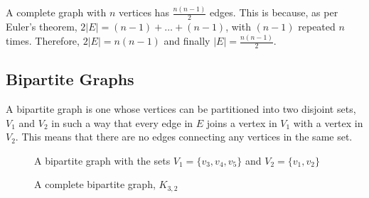 


A complete graph with $n$ vertices has $\frac{n(n - 1)}{2}$ edges. This is because, as per Euler's theorem,
 $2 \lvert E \rvert = (n - 1) + \ldots + (n - 1)$, with $(n - 1)$ repeated $n$ times. Therefore,
 $2 \lvert E \rvert = n(n - 1)$ and finally $\lvert E \rvert = \frac{n(n - 1)}{2}$.

\subsection*{Bipartite Graphs}

A bipartite graph is one whose vertices can be partitioned into two disjoint sets, $V_1$ and $V_2$ in such a way that
 every edge in $E$ joins a vertex in $V_1$ with a vertex in $V_2$. This means that there are no edges connecting any
 vertices in the same set.

\begin{minipage}[c]{0.45\linewidth}
  \begin{figure}[H]
    \centering
    \usetikzlibrary{graphs}
    \caption{A bipartite graph with the sets $V_1 = \{v_3, v_4, v_5\}$ and $V_2 = \{v_1, v_2\}$}
    \label{fig:graph3}
  \end{figure}
\end{minipage}\hfill
\begin{minipage}[c]{0.45\linewidth}
  \begin{figure}[H]
    \centering
    \usetikzlibrary{graphs}
    \caption{A complete bipartite graph, $K_{3,2}$}
    \label{fig:graph4}
  \end{figure}
\end{minipage}

